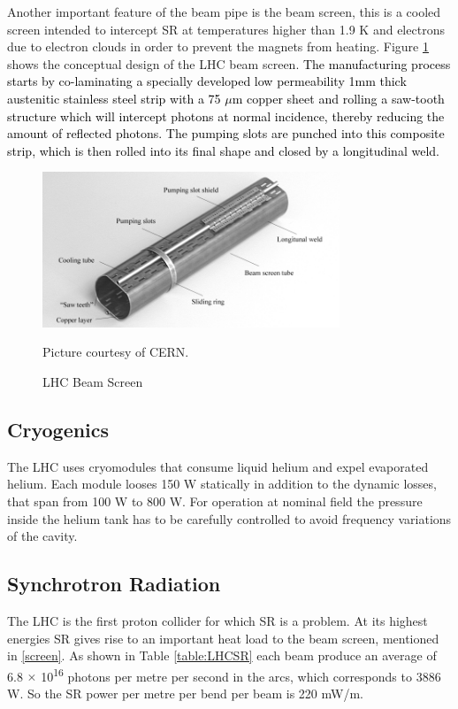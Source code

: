 \label{screen}
Another important feature of the beam pipe is the beam screen, this is a cooled screen intended to intercept SR at temperatures higher than 1.9 K and electrons due to electron clouds in order to prevent the magnets from heating. Figure \ref{fig:screen} shows the conceptual design of the LHC beam screen\citep{DR}\citep{vacuum}. 
\textcolor{black}{
The manufacturing process starts by co-laminating a specially developed low permeability 1mm thick
austenitic stainless steel strip with a 75 $\mu$m copper sheet and rolling a saw-tooth structure which  will intercept photons at normal incidence, thereby reducing the amount of reflected photons. The pumping slots are punched into this composite strip, which is then rolled into its final shape and closed by a longitudinal
weld\citep{vacuum}.
}
\begin{figure}
	\centering
  \begin{minipage}{\textwidth}
  	\centering
   	\includegraphics[width=3.5in]{Pictures/screen.png}
  		\caption{\label{fig:screen}
   			LHC Beam Screen}
   			\footnotesize{Picture courtesy of CERN.}
   \end{minipage}
\end{figure}

\subsection{Cryogenics}
\label{cryo}
The LHC uses cryomodules that consume liquid helium and expel evaporated helium. Each module looses 150 W statically in addition to the dynamic losses, that span from 100 W to 800 W.
For operation at nominal field the pressure inside the helium tank has to be carefully controlled to avoid frequency variations of the cavity\citep{DR}.
\subsection{Synchrotron Radiation}
The LHC is the first proton collider for which SR is a problem. At its highest energies SR gives rise to an important heat load to the beam screen\citep{DR}, mentioned in \ref{screen}. As shown in Table \ref{table:LHCSR} each beam produce an average of 6.8 $\times$ 10\textsuperscript{16} photons per metre per second in the arcs, which corresponds to 3886 W. So the SR power per metre per bend per beam is 220 mW/m. 

